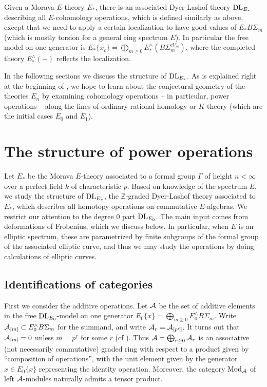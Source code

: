 \documentclass{gtpart}
\theoremstyle{definition}
\theoremstyle{remark}
\newcommand{\mb}[1]{\mathbb{#1}}
\newcommand{\DL}{{\rm DL}}
\newcommand{\CA}{{\cal A}}
\newcommand{\Mod}{{\rm Mod}}
\begin{document}
Given a Morava $E$-theory $E_*$, there is an associated Dyer-Lashof 
theory $\DL_{E_*}$ describing all $E$-cohomology operations, which is 
defined similarly as above, except that we need to apply a certain 
localization to have good values of $E_* B\Sigma_m$ (which is mostly torsion 
for a general ring spectrum $E$).  In particular the free model on 
one generator is $E_*\{x_c\} = \bigoplus_{m \geq 0} E_*^\wedge (B\Sigma_m^{cV_m})$, 
where the completed theory $E_*^\wedge (-)$ reflects the localization.  

In the following sections we discuss the structure of $\DL_{E_*}$.  As 
is explained right at the beginning of \cite{Andu}, we hope 
to learn about the conjectural geometry of the theories $E_n$ by 
examining cohomology operations -- in particular, power operations -- along the lines of ordinary rational homology or $K$-theory (which 
are the initial cases $E_0$ and $E_1$).  


\section{The structure of power operations}
\label{sec:at2ec}


Let $E_*$ be the Morava $E$-theory associated to a formal group 
$\Gamma$ of height $n < \infty$ over a perfect field $k$ of 
characteristic $p$.  Based on knowledge of the spectrum $E$, 
we study the structure of $\DL_{E_*}$, the $\mb Z$-graded Dyer-Lashof 
theory associated to $E_*$, which describes all homotopy operations 
on commutative $E$-algebras.  We restrict our attention to the 
degree 0 part $\DL_{E_0}$.  The main input comes from deformations 
of Frobenius, which we discuss below.  In particular, when 
$E$ is an elliptic spectrum, these are parametrized by finite 
subgroups of the formal group of the associated elliptic curve, 
and thus we may study the operations by doing calculations of 
elliptic curves.  


\subsection{Identifications of categories}
\label{subsec:id}

First we consider the additive operations.  Let $\CA$ be the set 
of additive elements in the free $\DL_{E_0}$-model on one generator 
$E_0\{x\} = \bigoplus_{m \geq 0} E_0^\wedge B\Sigma_m$.  Write 
$\CA_{[m]} \subset E_0^\wedge B\Sigma_m$ for the summand, and write 
$\CA_r = \CA_{[p^r]}$.  It turns out that $\CA_{[m]} = 0$ 
unless $m = p^r$ for some $r$ (cf \cite{strickland}).  Thus $\CA = \bigoplus_{r \geq 0} \CA_r$ 
is an associative (not necessarily commutative) graded ring 
with respect to a product given by ``composition of operations'', 
with the unit element given by the generator $x \in E_0\{x\}$ 
representing the identity operation.  Moreover, the category 
$\Mod_\CA$ of left $\CA$-modules naturally admits a tensor product.  
\end{document}
